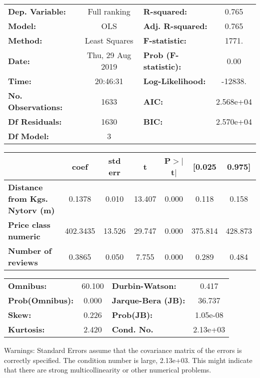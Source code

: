 \documentclass{report}
\begin{document}
\begin{center}
\begin{tabular}{lclc}
\toprule
\textbf{Dep. Variable:}                &   Full ranking   & \textbf{  R-squared:         } &     0.765   \\
\textbf{Model:}                        &       OLS        & \textbf{  Adj. R-squared:    } &     0.765   \\
\textbf{Method:}                       &  Least Squares   & \textbf{  F-statistic:       } &     1771.   \\
\textbf{Date:}                         & Thu, 29 Aug 2019 & \textbf{  Prob (F-statistic):} &     0.00    \\
\textbf{Time:}                         &     20:46:31     & \textbf{  Log-Likelihood:    } &   -12838.   \\
\textbf{No. Observations:}             &        1633      & \textbf{  AIC:               } & 2.568e+04   \\
\textbf{Df Residuals:}                 &        1630      & \textbf{  BIC:               } & 2.570e+04   \\
\textbf{Df Model:}                     &           3      & \textbf{                     } &             \\
\bottomrule
\end{tabular}
\begin{tabular}{lcccccc}
                                       & \textbf{coef} & \textbf{std err} & \textbf{t} & \textbf{P$>$$|$t$|$} & \textbf{[0.025} & \textbf{0.975]}  \\
\midrule
\textbf{Distance from Kgs. Nytorv (m)} &       0.1378  &        0.010     &    13.407  &         0.000        &        0.118    &        0.158     \\
\textbf{Price class numeric}           &     402.3435  &       13.526     &    29.747  &         0.000        &      375.814    &      428.873     \\
\textbf{Number of reviews}             &       0.3865  &        0.050     &     7.755  &         0.000        &        0.289    &        0.484     \\
\bottomrule
\end{tabular}
\begin{tabular}{lclc}
\textbf{Omnibus:}       & 60.100 & \textbf{  Durbin-Watson:     } &    0.417  \\
\textbf{Prob(Omnibus):} &  0.000 & \textbf{  Jarque-Bera (JB):  } &   36.737  \\
\textbf{Skew:}          &  0.226 & \textbf{  Prob(JB):          } & 1.05e-08  \\
\textbf{Kurtosis:}      &  2.420 & \textbf{  Cond. No.          } & 2.13e+03  \\
\bottomrule
\end{tabular}
\end{center}

Warnings: \newline
 [1] Standard Errors assume that the covariance matrix of the errors is correctly specified. \newline
 [2] The condition number is large, 2.13e+03. This might indicate that there are \newline
 strong multicollinearity or other numerical problems.
\end{document}
